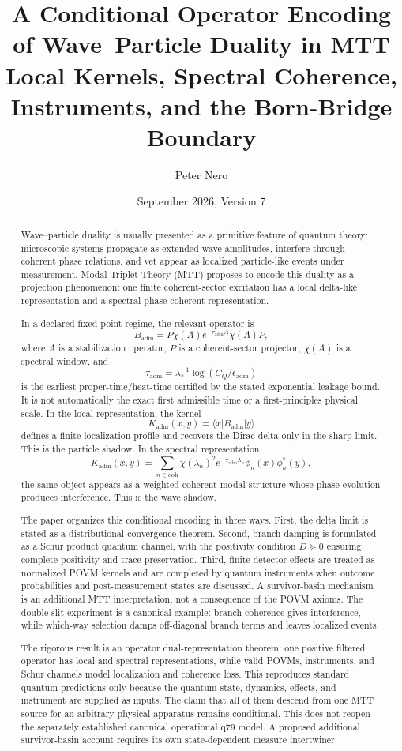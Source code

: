 \documentclass[11pt]{article}
\title{A Conditional Operator Encoding of Wave--Particle Duality in MTT\\
\large Local Kernels, Spectral Coherence, Instruments, and the Born-Bridge Boundary}
\author{Peter Nero}
\date{September 2026, Version 7}
\newcommand{\Kadm}{K_{\mathrm{adm}}}
\newcommand{\Badm}{B_{\mathrm{adm}}}
\newcommand{\ta}{\tau_{\mathrm{adm}}}
\newcommand{\epsadm}{\epsilon_{\mathrm{adm}}}
\newcommand{\coh}{\mathrm{coh}}
\begin{document}
\maketitle

\begin{abstract}
Wave--particle duality is usually presented as a primitive feature of quantum theory:
microscopic systems propagate as extended wave amplitudes, interfere through coherent
phase relations, and yet appear as localized particle-like events under measurement.
Modal Triplet Theory (MTT) proposes to encode this duality as a projection phenomenon:
one finite coherent-sector excitation has a local delta-like representation and a spectral
phase-coherent representation.

In a declared fixed-point regime, the relevant operator is
\[
  \Badm
  =
  P\chi(A)e^{-\ta A}\chi(A)P,
\]
where \(A\) is a stabilization operator, \(P\) is a coherent-sector projector,
\(\chi(A)\) is a spectral window, and
\[
  \ta
  =
  \lambda_\ast^{-1}\log(C_Q/\epsadm)
\]
is the earliest proper-time/heat-time certified by the stated exponential leakage bound. It
is not automatically the exact first admissible time or a first-principles physical scale.
In the local representation, the kernel
\[
  \Kadm(x,y)=\langle x|\Badm|y\rangle
\]
defines a finite localization profile and recovers the Dirac delta only in the sharp limit.
This is the particle shadow. In the spectral representation,
\[
  \Kadm(x,y)
  =
  \sum_{n\in \coh}
  \chi(\lambda_n)^2 e^{-\ta\lambda_n}
  \phi_n(x)\phi_n^\ast(y),
\]
the same object appears as a weighted coherent modal structure whose phase evolution
produces interference. This is the wave shadow.

The paper organizes this conditional encoding in three ways. First, the delta limit is stated as
a distributional convergence theorem. Second, branch damping is formulated as a Schur
product quantum channel, with the positivity condition \(D\succeq0\) ensuring complete
positivity and trace preservation. Third, finite detector effects are treated as normalized
POVM kernels and are completed by quantum instruments when outcome probabilities and
post-measurement states are discussed. A survivor-basin mechanism is an additional MTT
interpretation, not a consequence of the POVM axioms. The double-slit experiment is a
canonical example:
branch coherence gives interference, while which-way selection damps off-diagonal branch
terms and leaves localized events.

The rigorous result is an operator dual-representation theorem: one positive filtered operator
has local and spectral representations, while valid POVMs, instruments, and Schur channels
model localization and coherence loss. This reproduces standard quantum predictions only
because the quantum state, dynamics, effects, and instrument are supplied as inputs. The
claim that all of them descend from one MTT source for an arbitrary physical
apparatus remains conditional. This does not reopen the separately established
canonical operational q79 model. A proposed additional survivor-basin account
requires its own state-dependent measure intertwiner.
\end{abstract}
\end{document}
